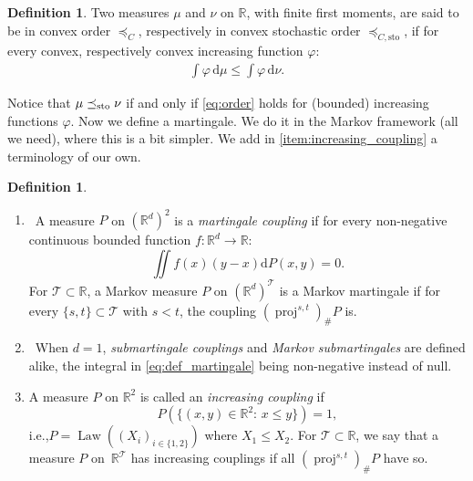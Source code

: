 \documentclass[11pt]{article}
\newcommand{\ie}{i.e.,\xspace}
\newcommand{\skpt}{\smallskip}
\theoremstyle{plain}
\theoremstyle{definition}
\newtheorem{defi}[them]{Definition}
\newcommand{\dd}{\mathrm{d}}
\newcommand{\Tt}{{\mathcal T}}
\newcommand{\R}{\mathbb{R}}
\newcommand{\law}{\operatorname{Law}}
\newcommand{\sto}{\mathrm{sto}}
\newcommand{\leqc}{\preceq_{C}}
\newcommand{\leqcs}{\preceq_{C,\sto}}
\newcommand{\leqs}{\preceq_{\text{\rm sto}}}
\newcommand{\pr}{\operatorname{proj}}
\begin{document}
\begin{defi}\label{defi:leqc}Two measures $\mu$ and $\nu$ on $\R$, with finite first moments, are said to be in convex order $\leqc$, respectively in convex stochastic order $\leqcs$, if for every convex, respectively convex increasing function $\varphi$:
\begin{align}\label{eq:order}
\int \varphi\, \dd \mu\leq \int \varphi\, \dd \nu.
\end{align}
\end{defi}

Notice that $\mu\leqs\nu$ if and only if \eqref{eq:order} holds for (bounded) increasing functions $\varphi$. Now we define a martingale. We do it in the Markov framework (all we need), where this is a bit simpler. We add in \eqref{item:increasing_coupling} a terminology of our own.

\skpt
\begin{defi}\label{defi:martingale}
\begin{enumerate}
\item
\label{item:martingale}\ A measure $P$ on $(\R^d)^2$ is a \emph{martingale coupling} if for every non-negative continuous bounded function $f:\R^d\to \R$:
\begin{equation}\label{eq:def_martingale}\iint f(x)(y-x) \dd P(x,y)=0.
\end{equation}
For $\Tt\subset\R$, a Markov measure $P$ on $(\R^d)^{\Tt}$ is a Markov martingale if for every $\{s,t\}\subset\Tt$ with $s<t$, the coupling $(\pr^{s,t})_\#P$ is.

\item\label{item:sousmartingale}\ When $d=1$, \emph{submartingale couplings} and \emph{Markov submartingales} are defined alike, the integral in \eqref{eq:def_martingale} being non-negative instead of null.

\item\label{item:increasing_coupling} A measure $P$ on $\R^2$ is called an \emph{increasing coupling} if
\[
P(\{(x,y)\in \R^2:\,x\leq y\})=1,
\]
\ie $P=\law((X_i)_{i\in\{1,2\}})$ where $X_1\leq X_2$. For $\Tt\subset\R$, we say that a measure $P$ on~$\R^\Tt$ has increasing couplings if all $(\pr^{s,t})_\#P$ have so.
\end{enumerate}
\end{defi}
\end{document}
